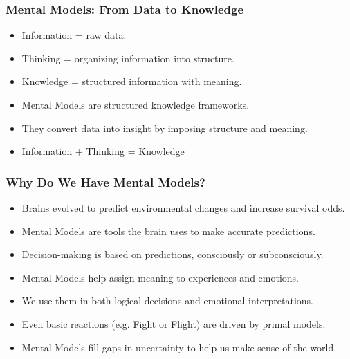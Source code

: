 \begin{frame}[fragile]\frametitle{Mental Models: From Data to Knowledge}
      \begin{itemize}
        \item Information = raw data.
        \item Thinking = organizing information into structure.
        \item Knowledge = structured information with meaning.
        \item Mental Models are structured knowledge frameworks.
        \item They convert data into insight by imposing structure and meaning.
		\item Information + Thinking = Knowledge
      \end{itemize}
	  
\end{frame}

\begin{frame}[fragile]\frametitle{Why Do We Have Mental Models?}
      \begin{itemize}
        \item Brains evolved to predict environmental changes and increase survival odds.
        \item Mental Models are tools the brain uses to make accurate predictions.
        \item Decision-making is based on predictions, consciously or subconsciously.
        \item Mental Models help assign meaning to experiences and emotions.
        \item We use them in both logical decisions and emotional interpretations.
        \item Even basic reactions (e.g. Fight or Flight) are driven by primal models.
        \item Mental Models fill gaps in uncertainty to help us make sense of the world.
      \end{itemize}
\end{frame}

